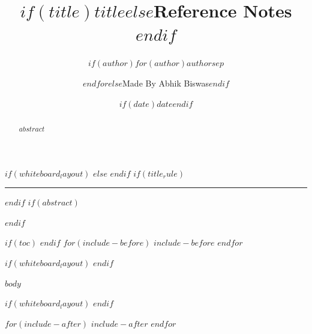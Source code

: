 \documentclass[$if(presentation_layout)$$else$$if(whiteboard_layout)$$else$a4paper,$endif$$endif$$if(fontsize)$$fontsize$$else$12pt$endif$]{article}
\title{$if(title)$$title$$else$Reference Notes$endif$}
\author{$if(author)$$for(author)$$author$$sep$ \and $endfor$$else$Made By Abhik Biswas$endif$}
\date{$if(date)$$date$$endif$}
\makeatletter
\def\relax{}%
\theoremstyle{plain}
\theoremstyle{definition}
\theoremstyle{remark}
\DeclareRobustCommand{\_}{\ifmmode\nfss@text{\textunderscore}\else\textunderscore\allowbreak\fi}
\makeatother
\begin{document}
\maketitle
$if(whiteboard_layout)$
\thispagestyle{empty}
$else$
\thispagestyle{fancy}
$endif$
$if(title_rule)$
\hrule
$endif$
\vspace{1.5em}
$if(abstract)$
\begin{abstract}
$abstract$
\end{abstract}
$endif$

$if(toc)$
\setcounter{tocdepth}{$if(toc-depth)$$toc-depth$$else$3$endif$}
\tableofcontents
\clearpage
$endif$
$for(include-before)$
$include-before$
$endfor$

$if(whiteboard_layout)$
\makeatletter
\let\wb@orig@newpage\newpage
\let\wb@orig@clearpage\clearpage
\def\newpage{\par\vspace{1.5em}\noindent\rule{\linewidth}{0.4pt}\par\vspace{1.5em}}%
\def\pagebreak{\newpage}%
\def\clearpage{\newpage}%
\def\cleardoublepage{\newpage}%
\def\eject{\newpage}%
\let\tcbbreak\relax
\makeatother
$endif$

$body$

$if(whiteboard_layout)$
\makeatletter
\let\newpage\wb@orig@newpage
\let\clearpage\wb@orig@clearpage
\makeatother
$endif$

$for(include-after)$
$include-after$
$endfor$
\end{document}
